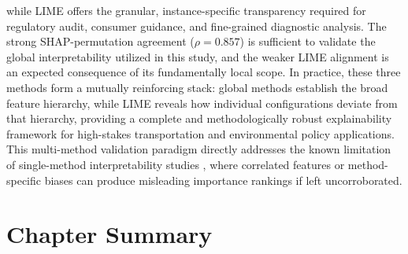 while LIME offers the granular, instance-specific transparency required for regulatory audit, consumer guidance, and fine-grained diagnostic analysis. The strong SHAP-permutation agreement (\(\rho = 0.857\)) is sufficient to validate the global interpretability utilized in this study, and the weaker LIME alignment is an expected consequence of its fundamentally local scope. In practice, these three methods form a mutually reinforcing stack: global methods establish the broad feature hierarchy, while LIME reveals how individual configurations deviate from that hierarchy, providing a complete and methodologically robust explainability framework for high-stakes transportation and environmental policy applications. This multi-method validation paradigm directly addresses the known limitation of single-method interpretability studies \cite{mangalathu2020failure}, where correlated features or method-specific biases can produce misleading importance rankings if left uncorroborated.



\section{Chapter Summary}

